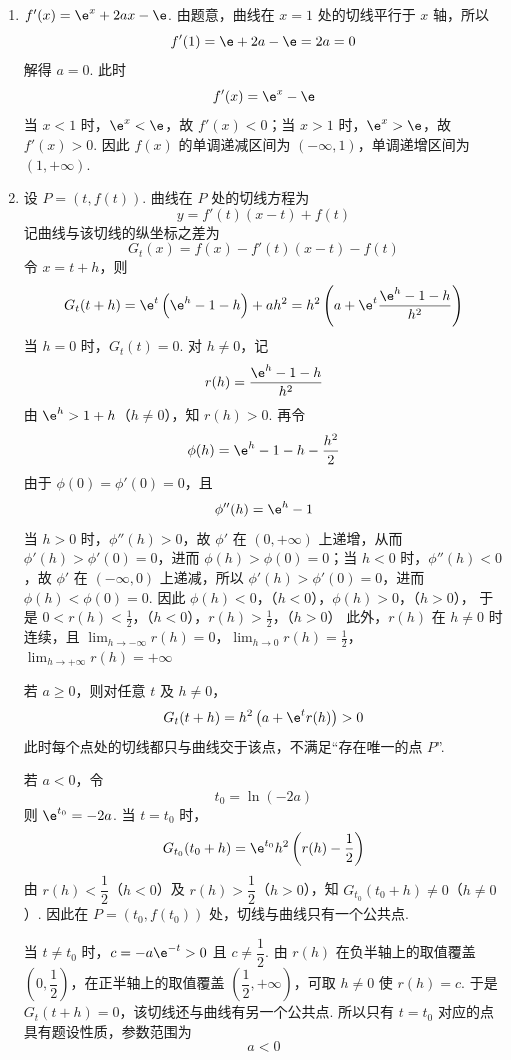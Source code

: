 \begin{solution}
\begin{enumerate}
\item \(f'(x)=\e^{x}+2ax-\e\). 由题意，曲线在 \(x=1\) 处的切线平行于 \(x\) 轴，所以
\[
f'(1)=\e+2a-\e=2a=0
\]
解得 \(a=0\). 此时
\[
f'(x)=\e^{x}-\e
\]
当 \(x<1\) 时，\(\e^{x}<\e\)，故 \(f'(x)<0\)；当 \(x>1\) 时，\(\e^{x}>\e\)，故 \(f'(x)>0\). 因此 \(f(x)\) 的单调递减区间为 \((-\infty,1)\)，单调递增区间为 \((1,+\infty)\).

\item 设 \(P=(t,f(t))\). 曲线在 \(P\) 处的切线方程为
\[
y=f'(t)(x-t)+f(t)
\]
记曲线与该切线的纵坐标之差为
\[
G_{t}(x)=f(x)-f'(t)(x-t)-f(t)
\]
令 \(x=t+h\)，则
\[
G_{t}(t+h)=\e^{t}\left(\e^{h}-1-h\right)+ah^{2}
=h^{2}\left(a+\e^{t}\frac{\e^{h}-1-h}{h^{2}}\right)
\]
当 \(h=0\) 时，\(G_{t}(t)=0\). 对 \(h\neq0\)，记
\[
r(h)=\frac{\e^{h}-1-h}{h^{2}}
\]
由 \(\e^{h}>1+h\)（\(h\neq0\)），知 \(r(h)>0\). 再令
\[
\phi(h)=\e^{h}-1-h-\frac{h^{2}}{2}
\]
由于 \(\phi(0)=\phi'(0)=0\)，且
\[
\phi''(h)=\e^{h}-1
\]
当 \(h>0\) 时，\(\phi''(h)>0\)，故 \(\phi'\) 在 \((0,+\infty)\) 上递增，从而 \(\phi'(h)>\phi'(0)=0\)，进而 \(\phi(h)>\phi(0)=0\)；当 \(h<0\) 时，\(\phi''(h)<0\)，故 \(\phi'\) 在 \((-\infty,0)\) 上递减，所以 \(\phi'(h)>\phi'(0)=0\)，进而 \(\phi(h)<\phi(0)=0\). 因此
\(\phi(h)<0\)，（\(h<0\)），\(\phi(h)>0\)，（\(h>0\)），
于是
\(0<r(h)<\frac{1}{2}\)，（\(h<0\)），\(r(h)>\frac{1}{2}\)，（\(h>0\)）
此外，\(r(h)\) 在 \(h\neq0\) 时连续，且
\(\lim_{h\to-\infty}r(h)=0\)，\(\lim_{h\to0}r(h)=\frac{1}{2}\)，\(\lim_{h\to+\infty}r(h)=+\infty\)

若 \(a\geqslant0\)，则对任意 \(t\) 及 \(h\neq0\)，
\[
G_{t}(t+h)=h^{2}\left(a+\e^{t}r(h)\right)>0
\]
此时每个点处的切线都只与曲线交于该点，不满足“存在唯一的点 \(P\)”.

若 \(a<0\)，令
\[
t_{0}=\ln(-2a)
\]
则 \(\e^{t_{0}}=-2a\). 当 \(t=t_{0}\) 时，
\[
G_{t_{0}}(t_{0}+h)
=\e^{t_{0}}h^{2}\left(r(h)-\frac{1}{2}\right)
\]
由 \(r(h)<\dfrac{1}{2}\)（\(h<0\)）及 \(r(h)>\dfrac{1}{2}\)（\(h>0\)），知 \(G_{t_{0}}(t_{0}+h)\neq0\)（\(h\neq0\)）. 因此在 \(P=(t_{0},f(t_{0}))\) 处，切线与曲线只有一个公共点.

当 \(t\neq t_{0}\) 时，\(c=-a\e^{-t}>0\) 且 \(c\neq\dfrac{1}{2}\). 由 \(r(h)\) 在负半轴上的取值覆盖 \((0,\dfrac{1}{2})\)，在正半轴上的取值覆盖 \((\dfrac{1}{2},+\infty)\)，可取 \(h\neq0\) 使 \(r(h)=c\). 于是 \(G_{t}(t+h)=0\)，该切线还与曲线有另一个公共点. 所以只有 \(t=t_{0}\) 对应的点具有题设性质，参数范围为
\[
a<0
\]
\end{enumerate}
\end{solution}

